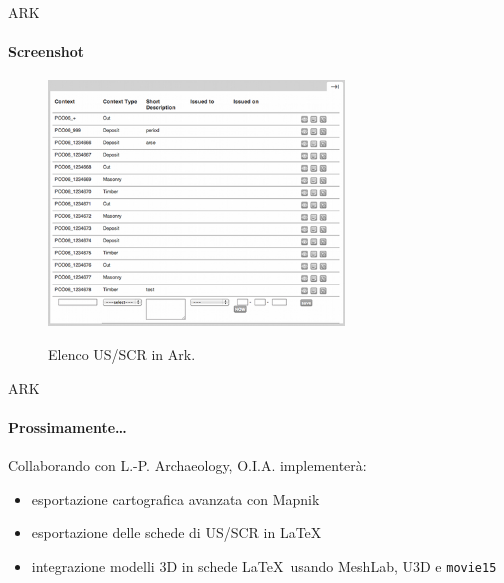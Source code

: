 \documentclass[xcolor=svgnames]{beamer}
\begin{document}

		\begin{frame}{ARK}
		\framesubtitle{Screenshot}
			\begin{figure}
				\centering
				\caption[Elenco US/SCR in Ark.]{Elenco US/SCR in Ark.}
				\includegraphics[width=0.7\textwidth]{img/ark_register}
				\label{fig:data_entry}
			\end{figure}
		\end{frame}


		\begin{frame}{ARK}
		\framesubtitle{Prossimamente\dots}
			Collaborando con L.-P. Archaeology, O.I.A. implementerà:
			\begin{itemize}
				\item esportazione cartografica avanzata con Mapnik
				\item esportazione delle schede di US/SCR in \LaTeX
				\item integrazione modelli 3D in schede \LaTeX~usando MeshLab, U3D e \texttt{movie15}
			\end{itemize}
		\end{frame}

\end{document}
